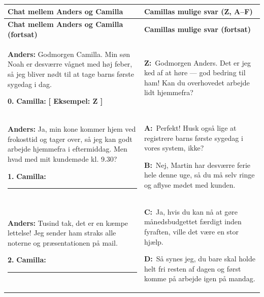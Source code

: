 \vspace{0.25em}
{\small
\renewcommand{\arraystretch}{1.35}
\begin{longtable}{@{} >{\raggedright\arraybackslash}p{8.25cm} @{\hspace{0.5cm}} >{\raggedright\arraybackslash}p{8.25cm} @{}}
\toprule
\textbf{\color{NCDNavy}Chat mellem Anders og Camilla} & \textbf{\color{NCDNavy}Camillas mulige svar (Z, A--F)} \\
\midrule
\endfirsthead
\toprule
\textbf{\color{NCDNavy}Chat mellem Anders og Camilla (fortsat)} & \textbf{\color{NCDNavy}Camillas mulige svar (fortsat)} \\
\midrule
\endhead
\bottomrule
\endfoot

\textbf{\color{NCDNavy}Anders:}\newline
Godmorgen Camilla. Min søn Noah er desværre vågnet med høj feber, så jeg bliver nødt til at tage barns første sygedag i dag.\par\vspace{4pt}
\textbf{0.} \textbf{\color{NCDTeal}Camilla:} \textcolor{NCDRed}{\textbf{[ Eksempel: Z ]}} &
\textbf{\color{NCDRed}Z:}\ Godmorgen Anders. Det er jeg ked af at høre --- god bedring til ham! Kan du overhovedet arbejde lidt hjemmefra? \\
\midrule

\textbf{\color{NCDNavy}Anders:}\newline
Ja, min kone kommer hjem ved frokosttid og tager over, så jeg kan godt arbejde hjemmefra i eftermiddag. Men hvad med mit kundemøde kl. 9.30?\par\vspace{4pt}
\textbf{1.} \textbf{\color{NCDTeal}Camilla:} \rule{1.2cm}{0.4pt} &
\textbf{\color{NCDNavy}A:}\ Perfekt! Husk også lige at registrere barns første sygedag i vores system, ikke?\par\vspace{6pt}
\textbf{\color{NCDNavy}B:}\ Nej, Martin har desværre ferie hele denne uge, så du må selv ringe og aflyse mødet med kunden. \\
\midrule

\textbf{\color{NCDNavy}Anders:}\newline
Tusind tak, det er en kæmpe lettelse! Jeg sender ham straks alle noterne og præsentationen på mail.\par\vspace{4pt}
\textbf{2.} \textbf{\color{NCDTeal}Camilla:} \rule{1.2cm}{0.4pt} &
\textbf{\color{NCDNavy}C:}\ Ja, hvis du kan nå at gøre månedsbudgettet færdigt inden fyraften, ville det være en stor hjælp.\par\vspace{6pt}
\textbf{\color{NCDNavy}D:}\ Så synes jeg, du bare skal holde helt fri resten af dagen og først komme på arbejde igen på mandag. \\
\midrule


\end{longtable}}
